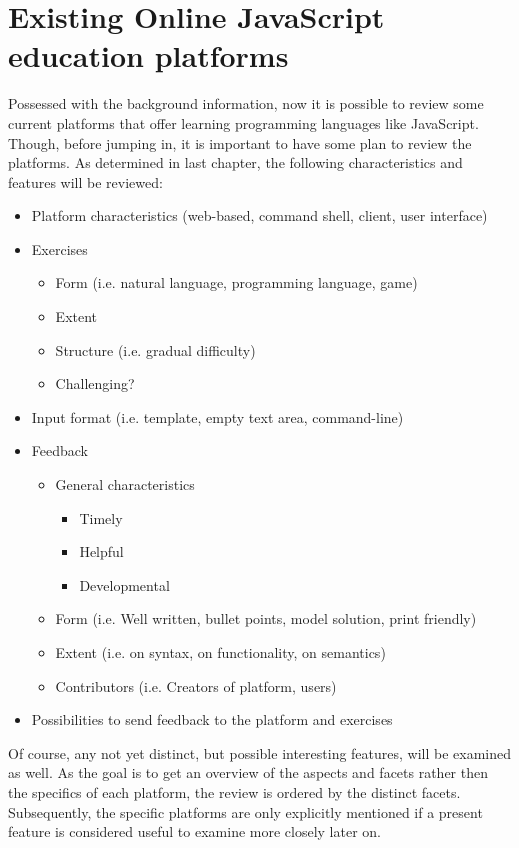 \documentclass{article}
\begin{document}
\section{Existing Online JavaScript education platforms} 
Possessed with the background information, now it is possible to
review some current platforms that offer learning programming languages like 
JavaScript. Though, before jumping in, it is important to have some plan to
review the platforms. As determined in last chapter, the following 
characteristics and features will be reviewed:
\begin{itemize}
  \item Platform characteristics (web-based, command shell, client, user interface)
  \item Exercises
    \begin{itemize}
      \item Form (i.e. natural language, programming language, game)
	  \item Extent
	  \item Structure (i.e. gradual difficulty)
	  \item Challenging?
    \end{itemize}
  \item Input format (i.e. template, empty text area, command-line)
  \item Feedback
    \begin{itemize}
	  \item General characteristics
	    \begin{itemize}
          \item Timely
	      \item Helpful
	      \item Developmental
        \end{itemize}
	  \item Form (i.e. Well written, bullet points, model solution, print friendly)
	  \item Extent (i.e. on syntax, on functionality, on semantics)
	  \item Contributors (i.e. Creators of platform, users)
	\end{itemize}
  \item Possibilities to send feedback to the platform and exercises
\end{itemize}

Of course, any not yet distinct, but possible interesting features, 
will be examined as well. As the goal is to get an overview of the aspects and
facets rather then the specifics of each platform, the review is ordered by 
the distinct facets. Subsequently, the specific platforms are only
explicitly mentioned if
a present feature is considered useful to examine more closely later on.
\end{document}
